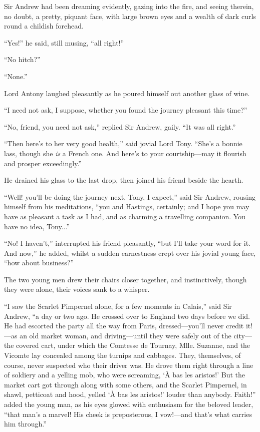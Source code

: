 Sir Andrew had been dreaming evidently, gazing into the fire, and seeing therein, no doubt, a pretty, piquant face, with large brown eyes and a wealth of dark curls round a childish forehead.

\enquote{Yes!} he said, still musing, \enquote{all right!}

\enquote{No hitch?}

\enquote{None.}

Lord Antony laughed pleasantly as he poured himself out another glass of wine.

\enquote{I need not ask, I suppose, whether you found the journey pleasant this time?}

\enquote{No, friend, you need not ask,} replied Sir Andrew, gaily. \enquote{It was all right.}

\enquote{Then here's to her very good health,} said jovial Lord Tony. \enquote{She's a bonnie lass, though she \textit{is} a French one. And here's to your courtship---may it flourish and prosper exceedingly.}

He drained his glass to the last drop, then joined his friend beside the hearth.

\enquote{Well! you'll be doing the journey next, Tony, I expect,} said Sir Andrew, rousing himself from his meditations, \enquote{you and Hastings, certainly; and I hope you may have as pleasant a task as I had, and as charming a travelling companion. You have no idea, Tony...}

\enquote{No! I haven't,} interrupted his friend pleasantly, \enquote{but I'll take your word for it. And now,} he added, whilst a sudden earnestness crept over his jovial young face, \enquote{how about business?}

The two young men drew their chairs closer together, and instinctively, though they were alone, their voices sank to a whisper.

\enquote{I saw the Scarlet Pimpernel alone, for a few moments in Calais,} said Sir Andrew, \enquote{a day or two ago. He crossed over to England two days before we did. He had escorted the party all the way from Paris, dressed---you'll never credit it!---as an old market woman, and driving---until they were safely out of the city---the covered cart, under which the Comtesse de Tournay, Mlle. Suzanne, and the Vicomte lay concealed among the turnips and cabbages. They, themselves, of course, never suspected who their driver was. He drove them right through a line of soldiery and a yelling mob, who were screaming, \enquote{À bas les aristos!} But the market cart got through along with some others, and the Scarlet Pimpernel, in shawl, petticoat and hood, yelled \enquote{À bas les aristos!} louder than anybody. Faith!} added the young man, as his eyes glowed with enthusiasm for the beloved leader, \enquote{that man's a marvel! His cheek is preposterous, I vow!---and that's what carries him through.}

